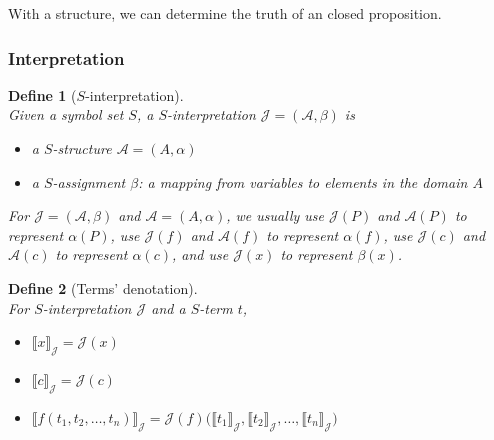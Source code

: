 \documentclass{ctexart}
\newcommand{\。}{．} %
\newenvironment{lvse}{
    \begin{tcolorbox}[enhanced, breakable, colback=qlv, boxrule=0pt, frame hidden,
        borderline west={0.7mm}{0.1mm}{slv}]
    }
    {\end{tcolorbox}}
\theoremstyle{t} %
\newtheorem{dyhj}{\color{slv} Define}[subsection] %
\newenvironment{dy}{\begin{lvse}\begin{dyhj}}{\end{dyhj}\end{lvse}}
\begin{document}
With a structure, we can determine the truth of an closed proposition.

\subsubsection{Interpretation}

\begin{dy}[$S$-interpretation]\quad \\
    Given a symbol set $S$, a $S$-interpretation $\mathcal{J} = (\mathcal{A}, \beta)$ is
    \begin{itemize}
        \item a \( S \)-structure \( \mathcal{A} = (A, \alpha) \)
        \item a \( S \)-assignment \( \beta \): a mapping from variables to elements in the domain \( A \)
    \end{itemize}
        
    For \( \mathcal{J} = (\mathcal{A}, \beta) \) and \( \mathcal{A} = (A, \alpha) \), we usually use \( \mathcal{J}(P) \) and \( \mathcal{A}(P) \) to represent \( \alpha(P) \), use \( \mathcal{J}(f) \) and \( \mathcal{A}(f) \) to represent \( \alpha(f) \), use \( \mathcal{J}(c) \) and \( \mathcal{A}(c) \) to represent \( \alpha(c) \), and use \( \mathcal{J}(x) \) to represent \( \beta(x) \).        
\end{dy}

\begin{dy}[Terms' denotation]\quad \\
    For $S$-interpretation $\mathcal{J}$ and a $S$-term $t$,
    \begin{itemize}
        \item $\llbracket x \rrbracket_{\mathcal{J}} = \mathcal{J}(x)$
        \item $\llbracket c \rrbracket_{\mathcal{J}} = \mathcal{J}(c)$
        \item $\llbracket f(t_1, t_2, \dots, t_n) \rrbracket_{\mathcal{J}} = \mathcal{J}(f) \big( \llbracket t_1 \rrbracket_{\mathcal{J}}, \llbracket t_2 \rrbracket_{\mathcal{J}}, \dots, \llbracket t_n \rrbracket_{\mathcal{J}} \big)$
    \end{itemize}
\end{dy}
\end{document}
